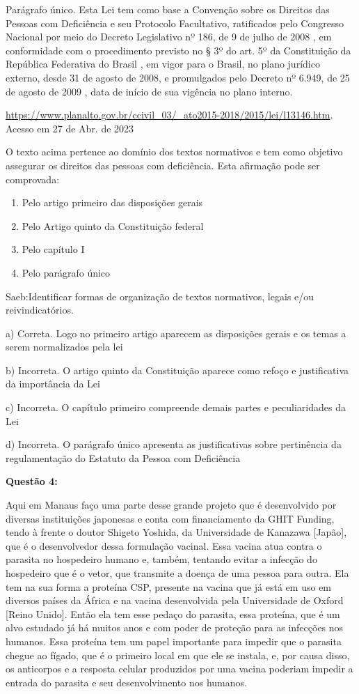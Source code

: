 Parágrafo único. Esta Lei tem como base a Convenção sobre os Direitos
das Pessoas com Deficiência e seu Protocolo Facultativo, ratificados
pelo Congresso Nacional por meio do Decreto Legislativo nº 186, de 9 de
julho de 2008 , em conformidade com o procedimento previsto no § 3º do
art. 5º da Constituição da República Federativa do Brasil , em vigor
para o Brasil, no plano jurídico externo, desde 31 de agosto de 2008, e
promulgados pelo Decreto nº 6.949, de 25 de agosto de 2009 , data de
início de sua vigência no plano interno.

\href{https://www.planalto.gov.br/ccivil_03/_ato2015-2018/2015/lei/l13146.htm}{{https://www.planalto.gov.br/ccivil\_03/\_ato2015-2018/2015/lei/l13146.htm}}.
Acesso em 27 de Abr. de 2023

O texto acima pertence ao domínio dos textos normativos e tem como
objetivo assegurar os direitos das pessoas com deficiência. Esta
afirmação pode ser comprovada:

\begin{enumerate}
\def\labelenumi{\alph{enumi})}
\item
  Pelo artigo primeiro das disposições gerais
\item
  Pelo Artigo quinto da Constituição federal
\item
  Pelo capítulo I
\item
  Pelo parágrafo único
\end{enumerate}

Saeb:Identificar formas de organização de textos normativos, legais e/ou
reivindicatórios.

a) Correta. Logo no primeiro artigo aparecem as disposições gerais e os
temas a serem normalizados pela lei

b) Incorreta. O artigo quinto da Constituição aparece como refoço e
justificativa da importância da Lei

c) Incorreta. O capítulo primeiro compreende demais partes e
peculiaridades da Lei

d) Incorreta. O parágrafo único apresenta as justificativas sobre
pertinência da regulamentação do Estatuto da Pessoa com Deficiência

\textbf{Questão 4:}

Aqui em Manaus faço uma parte desse grande projeto que é desenvolvido
por diversas instituições japonesas e conta com financiamento da GHIT
Funding, tendo à frente o doutor Shigeto Yoshida, da Universidade de
Kanazawa {[}Japão{]}, que é o desenvolvedor dessa formulação vacinal.
Essa vacina atua contra o parasita no hospedeiro humano e, também,
tentando evitar a infecção do hospedeiro que é o vetor, que transmite a
doença de uma pessoa para outra. Ela tem na sua forma a proteína CSP,
presente na vacina que já está em uso em diversos países da África e na
vacina desenvolvida pela Universidade de Oxford {[}Reino Unido{]}. Então
ela tem esse pedaço do parasita, essa proteína, que é um alvo estudado
já há muitos anos e com poder de proteção para as infecções nos humanos.
Essa proteína tem um papel importante para impedir que o parasita chegue
ao fígado, que é o primeiro local em que ele se instala, e, por causa
disso, os anticorpos e a resposta celular produzidos por uma vacina
poderiam impedir a entrada do parasita e seu desenvolvimento nos
humanos.

